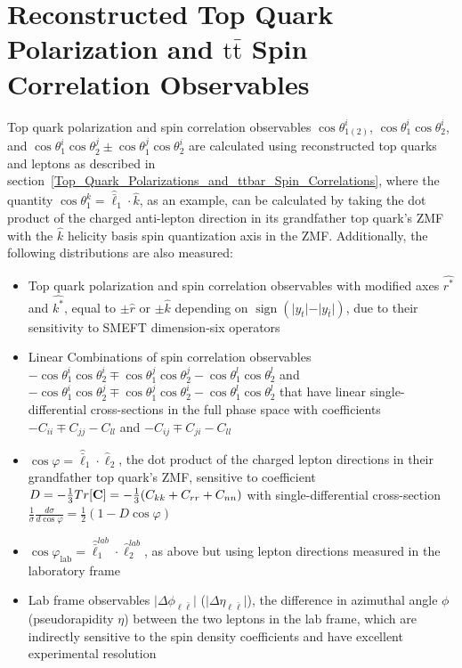 \section{Reconstructed Top Quark Polarization and \ensuremath{\mathrm{t\bar{t}}} Spin Correlation Observables}
\label{Reconstructed_Polarization_Spin_Correlation_Observables}
Top quark polarization and \ttbar spin correlation observables $\cos\theta_{1(2)}^i$, $\cos \theta_1^i \cos \theta_2^i$, and $\cos \theta_1^i \cos \theta_2^j \pm \cos \theta_1^j \cos \theta_2^i$ are calculated using reconstructed top quarks and leptons as described in section~\ref{Top_Quark_Polarizations_and_ttbar_Spin_Correlations}, where the quantity $\cos \theta_1^k = \hat{\bar{\ell}}_1 \cdot \hat{k}$, as an example, can be calculated by taking the dot product of the charged anti-lepton direction in its grandfather top quark's ZMF with the $\hat{k}$ helicity basis spin quantization axis in the \ttbar ZMF.
Additionally, the following distributions are also measured:
\begin{itemize}
    \item Top quark polarization and \ttbar spin correlation observables with modified axes $\hat{r^*}$ and $\hat{k^*}$, equal to $\pm \hat{r}$ or $\pm \hat{k}$ depending on $\operatorname{sign}(\vert y_t \vert-\vert y_{\bar{t}} \vert)$, due to their sensitivity to SMEFT dimension-six operators
    \item Linear Combinations of spin correlation observables $-\cos \theta_1^i \cos \theta_2^i \mp \cos \theta_1^j \cos \theta_2^j - \cos \theta_1^l \cos \theta_2^l$ and $-\cos \theta_1^i \cos \theta_2^j \mp \cos \theta_1^j \cos \theta_2^i - \cos \theta_1^l \cos \theta_2^l$ that have linear single-differential cross-sections in the full phase space with coefficients $-C_{ii} \mp C_{jj} - C_{ll}$ and $-C_{ij} \mp C_{ji} - C_{ll}$
    \item  $\cos\varphi=\hat{\bar{\ell}}_{1} \cdot \hat{\ell}_2$, the dot product of the charged lepton directions in their grandfather top quark's ZMF, sensitive to coefficient $D = -\frac{1}{3}Tr[\mathbf{C}] = -\frac{1}{3}(C_{kk} + C_{rr} + C_{nn})$ with single-differential cross-section $\tfrac{1}{\sigma}\tfrac{d\sigma}{d\cos\varphi} = \tfrac{1}{2}(1-D\cos\varphi)$
    \item $\cos\varphi_{\mathrm{lab}}=\hat{\bar{\ell}}^{lab}_1 \cdot \hat{\ell}^{lab}_2$, as above but using lepton directions measured in the laboratory frame
    \item Lab frame observables $\vert \Delta\phi_{\ell\bar{\ell}} \vert$ ($\vert \Delta\eta_{\ell\bar{\ell}} \vert$), the difference in azimuthal angle $\phi$ (pseudorapidity $\eta$) between the two leptons in the lab frame, which are indirectly sensitive to the spin density coefficients and have excellent experimental resolution
\end{itemize}
